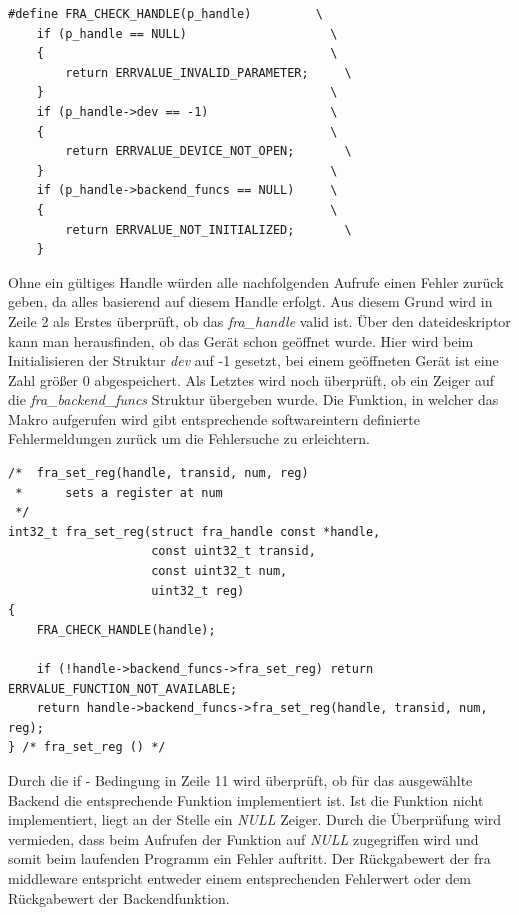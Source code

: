 \begin{lstfloat}
\begin{lstlisting}
#define FRA_CHECK_HANDLE(p_handle)         \
	if (p_handle == NULL)                    \
	{                                        \
		return ERRVALUE_INVALID_PARAMETER;     \
	}                                        \
	if (p_handle->dev == -1)                 \
	{                                        \
		return ERRVALUE_DEVICE_NOT_OPEN;       \
	}                                        \
	if (p_handle->backend_funcs == NULL)     \
	{                                        \
		return ERRVALUE_NOT_INITIALIZED;       \
	}  
\end{lstlisting}
\end{lstfloat}

Ohne ein gültiges Handle würden alle nachfolgenden Aufrufe einen Fehler zurück geben, da alles basierend auf diesem Handle erfolgt. Aus diesem Grund wird in Zeile 2 als Erstes überprüft, ob das \textit{fra\_handle} valid ist. Über den \gls{dateideskriptor} kann man herausfinden, ob das Gerät schon geöffnet wurde. Hier wird beim Initialisieren der Struktur \textit{dev} auf -1 gesetzt, bei einem geöffneten Gerät ist eine Zahl größer 0 abgespeichert. Als Letztes wird noch überprüft, ob ein Zeiger auf die \textit{fra\_backend\_funcs} Struktur übergeben wurde. Die Funktion, in welcher das Makro aufgerufen wird gibt entsprechende softwareintern definierte Fehlermeldungen zurück um die Fehlersuche zu erleichtern.\\


\begin{lstfloat}
\begin{lstlisting}
/*  fra_set_reg(handle, transid, num, reg)
 *      sets a register at num
 */
int32_t fra_set_reg(struct fra_handle const *handle,
					const uint32_t transid,
					const uint32_t num, 
					uint32_t reg)
{
	FRA_CHECK_HANDLE(handle);

	if (!handle->backend_funcs->fra_set_reg) return ERRVALUE_FUNCTION_NOT_AVAILABLE;
	return handle->backend_funcs->fra_set_reg(handle, transid, num, reg);
} /* fra_set_reg () */
\end{lstlisting}
\end{lstfloat}

Durch die if - Bedingung in Zeile 11 wird überprüft, ob für das ausgewählte Backend die entsprechende Funktion implementiert ist. Ist die Funktion nicht implementiert, liegt an der Stelle ein \textit{NULL} Zeiger. Durch die Überprüfung wird vermieden, dass beim Aufrufen der Funktion auf \textit{NULL} zugegriffen wird und somit beim laufenden Programm ein Fehler auftritt. Der Rückgabewert der \ac{fra} \gls{middleware} entspricht entweder einem entsprechenden Fehlerwert oder dem Rückgabewert der Backendfunktion. 



